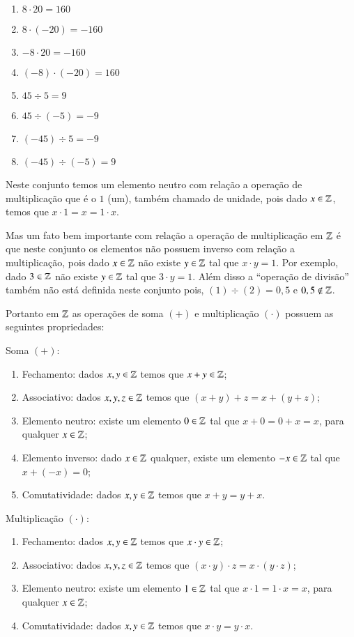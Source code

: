   \begin{multicols}{2}
  \begin{enumerate}[1)]
   \item $8 \cdot 20= 160$
   \item $8 \cdot (-20)= -160$
   \item $-8 \cdot 20= -160$
   \item $(-8) \cdot (-20)= 160$
   \item $45 \div 5= 9$
   \item $45 \div (-5)= -9$
   \item $(-45) \div 5= -9$
   \item $(-45) \div (-5)= 9$
  \end{enumerate}
  \end{multicols}

 Neste conjunto temos um elemento neutro com relação a operação de multiplicação que é o $1$ (um), também chamado de unidade, pois dado $x \in \mathbb{Z}$, temos que $x \cdot 1= x= 1 \cdot x$.

 Mas um fato bem importante com relação a operação de multiplicação em $\mathbb{Z}$ é que neste conjunto os elementos não possuem inverso com relação a multiplicação, pois dado $x \in \mathbb{Z}$ não existe $y \in \mathbb{Z}$ tal que $x \cdot y= 1$. Por exemplo, dado $3 \in \mathbb{Z}$ não existe $y \in \mathbb{Z}$ tal que $3 \cdot y= 1$. Além disso a ``operação de divisão'' também não está definida neste conjunto pois, $(1)\div (2)= 0,5$ e $0,5 \notin \mathbb{Z}$.

   \vskip0.3cm

 Portanto em $\mathbb{Z}$ as operações de soma $(+)$ e multiplicação $(\cdot)$ possuem as seguintes propriedades:

 Soma $(+)$:
 \begin{enumerate}[1)]
 \item Fechamento: dados $x, y \in \mathbb{Z}$ temos que $x+y \in \mathbb{Z}$;
 \item Associativo: dados $x, y, z \in \mathbb{Z}$ temos que $(x+y)+z= x+(y+z)$;
 \item Elemento neutro: existe um elemento $0 \in \mathbb{Z}$ tal que $x+0=0+x=x$, para qualquer $x \in \mathbb{Z}$;
 \item Elemento inverso: dado $x \in \mathbb{Z}$ qualquer, existe um elemento $-x \in \mathbb{Z}$ tal que $x+(-x)=0$;
 \item Comutatividade: dados $x, y \in \mathbb{Z}$ temos que $x+y= y+x$.
 \end{enumerate}

  Multiplicação $(\cdot)$:
 \begin{enumerate}[1)]
 \item Fechamento: dados $x, y \in \mathbb{Z}$ temos que $x \cdot y \in \mathbb{Z}$;
 \item Associativo: dados $x, y, z \in \mathbb{Z}$ temos que $(x \cdot y) \cdot z= x \cdot (y \cdot z)$;
 \item Elemento neutro: existe um elemento $1 \in \mathbb{Z}$ tal que $x \cdot 1= 1 \cdot x= x$, para qualquer $x \in \mathbb{Z}$;
 \item Comutatividade: dados $x, y \in \mathbb{Z}$ temos que $x \cdot y= y \cdot x$.
 \end{enumerate}

